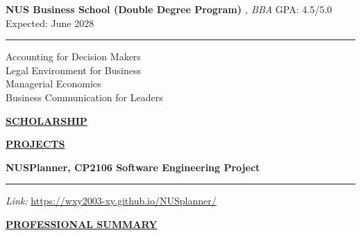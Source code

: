 \documentclass{article}
\begin{document}
\noindent\textbf{NUS Business School (Double Degree Program)} \textit{, BBA} \hfill GPA: 4.5/5.0 {   } Expected: June 2028 \\
\vspace{-0.7cm} %

\noindent\rule{\linewidth}{0.4pt}
\indent \text{} 
\vspace{-0.4cm} %
\begin{multicols}{2}
    \indent\indent\textbullet{} Accounting for Decision Makers \\
    \indent\indent\textbullet{} Legal Environment for Business \\
    \indent\indent\textbullet{} Managerial Economics \\
    \indent\indent\textbullet{} Business Communication for Leaders
\end{multicols}

\vspace{0.1cm}

\noindent \textbf{\underline{SCHOLARSHIP}} \\
\vspace{-0.2cm}

\noindent {}

\vspace{0.3cm}

\noindent \textbf{\underline{PROJECTS}} \\
\vspace{-0.2cm}

\noindent \textbf{NUSPlanner, CP2106 Software Engineering Project} \\
\vspace{-0.7cm} %

\noindent\rule{\linewidth}{0.4pt} %
\textit{Link:} \href{https://wxy2003-xy.github.io/NUSplanner/}{https://wxy2003-xy.github.io/NUSplanner/} \\
\textbullet{} 
\vspace{0.2cm}

\noindent \textbf{\underline{PROFESSIONAL SUMMARY}} \\
\vspace{-0.2cm}
\end{document}
